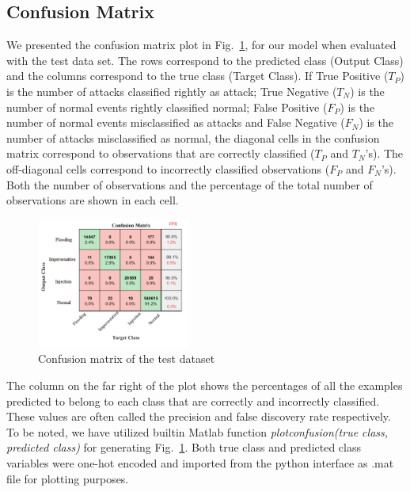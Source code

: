 \documentclass[letterpaper, 10pt, conference]{ieeeconf} %
\newcommand{\fig}[1]{Fig.~\ref{#1}}
\begin{document}
\subsection{Confusion Matrix}

We presented the confusion matrix plot  in \fig{fig:confusionmatrix}, for our model when evaluated with the test data set. The rows correspond to the predicted class (Output Class) and the columns correspond to the true class (Target Class). If True Positive ($T_P$) is the number of attacks classified
rightly as attack; True Negative ($T_N$) is the number of normal
events rightly classified normal; False Positive ($F_P$) is the
number of normal events misclassified as attacks and False
Negative ($F_N$) is the number of attacks misclassified as
normal, the diagonal cells in the confusion matrix correspond to observations that are correctly classified ($T_P$ and $T_N$'s). The off-diagonal cells correspond to incorrectly classified observations ($F_P$ and $F_N$'s). Both the number of observations and the percentage of the total number of observations are shown in each cell.
 \begin{figure}
      \centering
\includegraphics[width=0.45\textwidth]{Figures/cm.png}
\caption{Confusion matrix of the test dataset}
      \label{fig:confusionmatrix}
    \end{figure}
   

The column on the far right of the plot shows the percentages of all the examples predicted to belong to each class that are correctly and incorrectly classified. These values are often called the precision and false discovery rate respectively. To be noted, we have utilized builtin Matlab function \emph{plotconfusion(true class, predicted class)} for generating  \fig{fig:confusionmatrix}. Both true class and predicted class variables were one-hot encoded and imported from the python interface as .mat file for plotting purposes.
\end{document}
